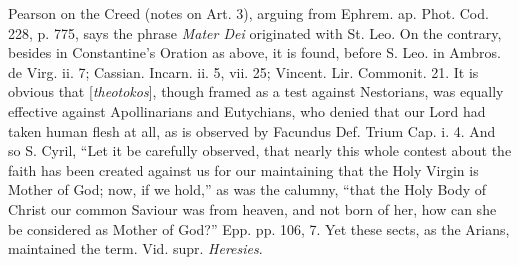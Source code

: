 Pearson on the Creed (notes on Art. 3), arguing
from Ephrem. ap. Phot. Cod. 228, p. 775, says the phrase \emph{Mater Dei}
originated with St. Leo. On the contrary, besides in Constantine's
Oration as above, it is found, before S. Leo. in Ambros. de Virg. ii.
7; Cassian. Incarn. ii. 5, vii. 25; Vincent. Lir. Commonit. 21. It is
obvious that [\emph{theotokos}], though framed as a test against
Nestorians, was equally effective against Apollinarians and Eutychians,
who denied that our Lord had taken human flesh at all, as is observed
by Facundus Def. Trium Cap. i. 4. And so S. Cyril, ``Let it be
carefully observed, that nearly this whole contest about the faith has
been created against us for our maintaining that the Holy Virgin is
Mother of God; now, if we hold,'' as was the calumny, ``that the Holy
Body of Christ our common Saviour was from heaven, and not born of
her, how can she be considered as Mother of God?'' Epp. pp.
106, 7. Yet these sects, as the Arians, maintained the term. Vid. supr.
\emph{Heresies}.

